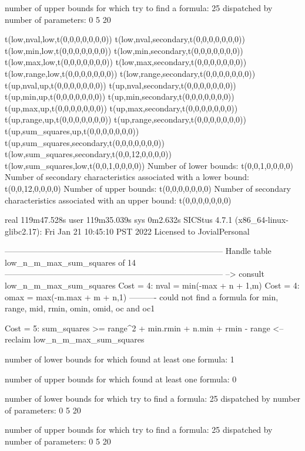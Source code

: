 number of upper bounds for which try to find a formula: 25
dispatched by number of parameters: 0  5  20

t(low,nval,low,t(0,0,0,0,0,0,0))
t(low,nval,secondary,t(0,0,0,0,0,0,0))
t(low,min,low,t(0,0,0,0,0,0,0))
t(low,min,secondary,t(0,0,0,0,0,0,0))
t(low,max,low,t(0,0,0,0,0,0,0))
t(low,max,secondary,t(0,0,0,0,0,0,0))
t(low,range,low,t(0,0,0,0,0,0,0))
t(low,range,secondary,t(0,0,0,0,0,0,0))
t(up,nval,up,t(0,0,0,0,0,0,0))
t(up,nval,secondary,t(0,0,0,0,0,0,0))
t(up,min,up,t(0,0,0,0,0,0,0))
t(up,min,secondary,t(0,0,0,0,0,0,0))
t(up,max,up,t(0,0,0,0,0,0,0))
t(up,max,secondary,t(0,0,0,0,0,0,0))
t(up,range,up,t(0,0,0,0,0,0,0))
t(up,range,secondary,t(0,0,0,0,0,0,0))
t(up,sum_squares,up,t(0,0,0,0,0,0,0))
t(up,sum_squares,secondary,t(0,0,0,0,0,0,0))
t(low,sum_squares,secondary,t(0,0,12,0,0,0,0))
t(low,sum_squares,low,t(0,0,1,0,0,0,0))
Number of lower bounds:                                             t(0,0,1,0,0,0,0)
Number of secondary characteristics associated with a lower bound:  t(0,0,12,0,0,0,0)
Number of upper bounds:                                             t(0,0,0,0,0,0,0)
Number of secondary characteristics associated with an upper bound: t(0,0,0,0,0,0,0)

real	119m47.528s
user	119m35.039s
sys	0m2.632s
SICStus 4.7.1 (x86_64-linux-glibc2.17): Fri Jan 21 10:45:10 PST 2022
Licensed to JovialPersonal


--------------------------------------------------------------------------------
Handle table low_n_m_max_sum_squares of 14
--------------------------------------------------------------------------------
--> consult low_n_m_max_sum_squares
Cost =  4:  nval  = min(-max + n + 1,m)
Cost =  4:  omax  = max(-m.max + m + n,1)
----------
could not find a formula for min, range, mid, rmin, omin, omid, oc and oc1

Cost =  5:  sum_squares >= range^2 + min.rmin + n.min + rmin - range
<-- reclaim low_n_m_max_sum_squares

number of lower bounds for which found at least one formula: 1

number of upper bounds for which found at least one formula: 0

number of lower bounds for which try to find a formula: 25
dispatched by number of parameters: 0  5  20

number of upper bounds for which try to find a formula: 25
dispatched by number of parameters: 0  5  20

